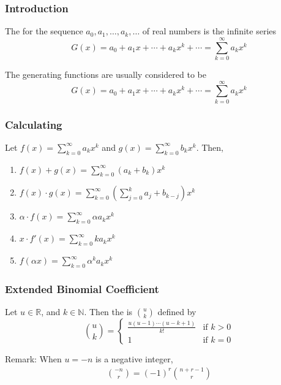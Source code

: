 \subsubsection{Introduction}

\begin{definition}
    The  for the sequence $a_0,a_1,\dots,a_k,\dots$ of real numbers is the infinite series
    \[ G(x)=a_0+a_1 x+\cdots + a_kx^k + \cdots=\sum_{k=0}^{\infty}a_kx^k \]
\end{definition}
\begin{definition}
    The generating functions are usually considered to be 
    \[ G(x)=a_0+a_1 x+\cdots + a_kx^k + \cdots=\sum_{k=0}^{\infty}a_kx^k \]
\end{definition}

\subsubsection{Calculating}
\begin{theorem}
    Let $\displaystyle  f(x)=\sum_{k=0}^{\infty} a_k x^k$ and $\displaystyle g(x)=\sum_{k=0}^{\infty} b_k x^k$. Then, 
    \begin{enumerate}
        \item $\displaystyle f(x)+g(x)=\sum_{k=0}^{\infty}(a_k+b_k)x^k$
        \item $\displaystyle f(x)\cdot g(x)=\sum_{k=0}^{\infty}\left(\sum_{j=0}^{k}a_j+b_{k-j}\right)x^k$
        \item $\displaystyle \alpha \cdot f(x)=\sum_{k=0}^{\infty}\alpha a_k x^k$
        \item $\displaystyle x\cdot f'(x)=\sum_{k=0}^{\infty}ka_k x^k$
        \item $\displaystyle f(\alpha x)=\sum_{k=0}^{\infty}\alpha^k a_k x^k$
    \end{enumerate}
\end{theorem}

\subsubsection{Extended Binomial Coefficient}
\begin{definition}
    Let $u \in \mathbb{R}$, and $k \in \mathbb{N}$. Then the  is $\displaystyle \binom{u}{k}$ defined by
    \[ \binom{u}{k}=\left\{ \begin{array}{lc}
        \frac{u(u-1)\cdots(u-k+1)}{k!} & \text{if }k>0\\
        1 & \text{if }k=0
    \end{array} \right. \]
\end{definition}
Remark: When $u=-n$ is a negative integer, 
\begin{align*}
    \binom{-n}{r}=(-1)^r \binom{n+r-1}{r}
\end{align*}

